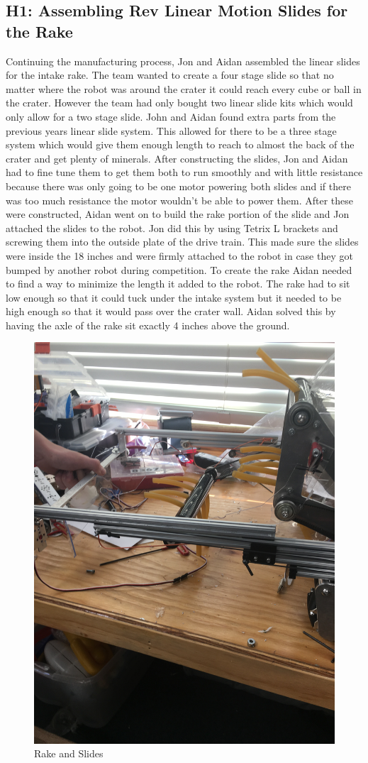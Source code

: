 \documentclass{article}
\begin{document}
\subsection{H1: Assembling Rev Linear Motion Slides for the Rake}

Continuing the manufacturing process, Jon and Aidan assembled the linear slides for the intake rake. The team wanted to create a four stage slide so that no matter where the robot was around the crater it could reach every cube or ball in the crater. However the team had only bought two linear slide kits which would only allow for a two stage slide. John and Aidan found extra parts from the previous years linear slide system. This allowed for there to be a three stage system which would give them enough length to reach to almost the back of the crater and get plenty of minerals. After constructing the slides, Jon and Aidan had to fine tune them to get them both to run smoothly and with little resistance because there was only going to be one motor powering both slides and if there was too much resistance the motor wouldn't be able to power them. After these were constructed, Aidan went on to build the rake portion of the slide and Jon attached the slides to the robot. Jon did this by using Tetrix L brackets and screwing them into the outside plate of the drive train. This made sure the slides were inside the 18 inches and were firmly attached to the robot in case they got bumped by another robot during competition. To create the rake Aidan needed to find a way to minimize the length it added to the robot. The rake had to sit low enough so that it could tuck under the intake system but it needed to be high enough so that it would pass over the crater wall. Aidan solved this by having the axle of the rake sit exactly 4 inches above the ground.

\begin{figure}
    \centering
    \includegraphics[width=.6 \textwidth, angle=-90 ]{11_11-12/images/rake_slides.JPG}
    \caption{Rake and Slides}
    \label{fig:Intake CAD}
\end{figure}
\end{document}
